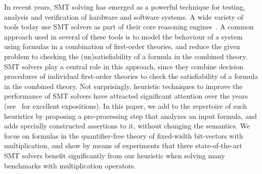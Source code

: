%
In recent years, SMT solving has emerged as a powerful technique for
testing, analysis and verification of hardware and software systems.
A wide variety of tools today use SMT solvers as part of their core
reasoning
engines~\cite{hwcbmc,boolector,ebmc,cbmc,corral,boogie,crv1,crv2,dart,concolic}.
A common approach used in several of these tools is to model the
behaviour of a system using formulas in a combination of first-order
theories, and reduce the given problem to checking the
(un)satisfiability of a formula in the combined theory.  SMT solvers
play a central role in this approach, since they combine decision
procedures of individual first-order theories to check the
satisfiability of a formula in the combined theory.  Not surprisingly,
heuristic techniques to improve the performance of SMT solvers have
attracted significant attention over the years %
(see~\cite{barrett,deMoura2013} for excellent expositions).  In this
paper, we add to the repertoire of such heuristics by proposing a
pre-processing step that analyzes an input formula, and adds specially
constructed assertions to it, without changing the semantics. We focus
on formulas in the quantifier-free theory of fixed-width bit-vectors
with multiplication, and show by means of experiments that three
state-of-the-art SMT solvers benefit significantly from our heuristic
when solving many benchmarks with multiplication operators.%


